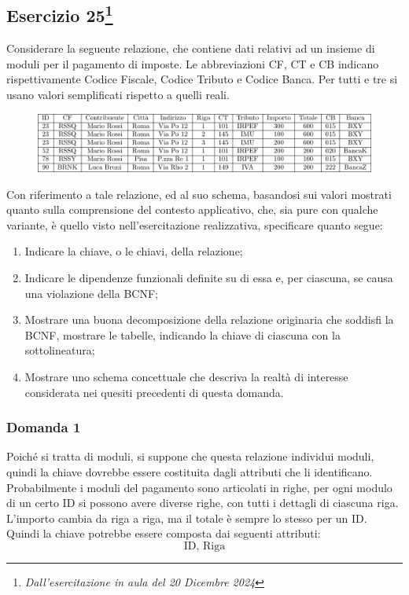 \documentclass{article}
\begin{document}
\subsection{Esercizio 25\footnote{\textit{Dall'esercitazione in aula del 20 Dicembre 2024}}}

Considerare la seguente relazione, che contiene dati relativi ad un insieme di moduli per il pagamento di imposte. Le abbreviazioni CF, CT e CB indicano rispettivamente Codice Fiscale, Codice Tributo e Codice Banca. Per tutti e tre si usano valori semplificati rispetto a quelli reali. 

\begin{figure}[H]%
    \centering%
    \includegraphics[scale=0.85]{relazione_1_20-12-24.pdf}%
\end{figure}

Con riferimento a tale relazione, ed al suo schema, basandosi sui valori mostrati quanto sulla comprensione del contesto applicativo, che, sia pure con qualche variante, è quello visto nell'esercitazione realizzativa, specificare quanto segue:
\begin{enumerate}
    \item Indicare la chiave, o le chiavi, della relazione;
    \item Indicare le dipendenze funzionali definite su di essa e, per ciascuna, se causa una violazione della BCNF;
    \item Mostrare una buona decomposizione della relazione originaria che soddisfi la BCNF, mostrare le tabelle, indicando la chiave di ciascuna con la sottolineatura;
    \item Mostrare uno schema concettuale che descriva la realtà di interesse considerata nei quesiti precedenti di questa domanda. 
\end{enumerate}

\subsubsection*{Domanda 1}

Poiché si tratta di moduli, si suppone che questa relazione individui moduli, quindi la chiave dovrebbe essere costituita dagli attributi che li identificano. Probabilmente i moduli del pagamento sono articolati in righe, per ogni modulo di un certo ID si possono avere diverse righe, con tutti i dettagli di ciascuna riga. L'importo cambia da riga a riga, ma il totale è sempre lo stesso per un ID. Quindi la chiave potrebbe essere composta dai seguenti attributi:
\begin{equation}
    \text{ID, Riga}
\end{equation}
\end{document}

